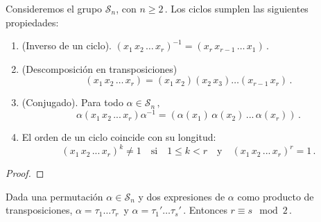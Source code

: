 \begin{nprop}
\label{proposition:propiedades-ciclos}
Consideremos el grupo $\mathcal S_n$, con $n \ge 2$\,. Los ciclos sumplen las siguientes propiedades:

\begin{enumerate}
  \item (Inverso de un ciclo). $(x_1 \, x_2 \, \hdots \, x_r)^{-1} = (x_r \, x_{r-1} \, \hdots \, x_1)$\,.
  \item (Descomposición en transposiciones) \begin{equation*}
    (x_1 \, x_2 \, \hdots \, x_r) = (x_1 \, x_2)(x_2 \, x_3) \hdots (x_{r-1} \, x_r)\,.
  \end{equation*}
  \item (Conjugado). Para todo $\alpha \in \mathcal S_n\,,$ \begin{equation*}
    \alpha (x_1 \, x_2 \, ... \, x_r) \alpha^{-1} = \left(\alpha(x_1) \, \alpha(x_2) \, ... \, \alpha(x_r)\right)\,.
  \end{equation*}
  \item El orden de un ciclo coincide con su longitud: \begin{equation*}
    (x_1 \, x_2 \, ... \, x_r)^k \neq 1 \quad \text{si} \quad 1 \le k < r \quad \text{y}\quad (x_1 \, x_2 \, ... \, x_r)^r = 1\,.
  \end{equation*}
\end{enumerate}
\end{nprop}

\begin{proof}

\end{proof}

\begin{nth}\label{theorem:paridad-permutacion} 
Dada una permutación $\alpha \in \mathcal S_n$ y dos expresiones de $\alpha$ como producto de transposiciones, $\alpha = \tau_1\hdots\tau_r$\, y $\alpha = \tau_1'\hdots\tau_s'$\,. Entonces $r \equiv s \mod 2$\,.
\end{nth}

